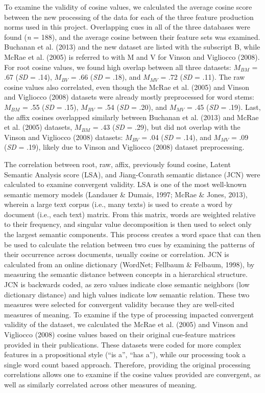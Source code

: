 \documentclass[english,,man]{apa6}
\begin{document}
To examine the validity of cosine values, we calculated the average cosine score between the new processing of the data for each of the three feature production norms used in this project. Overlapping cues in all of the three databases were found (\emph{n} = 188), and the average cosine between their feature sets was examined. Buchanan et al. (2013) and the new dataset are listed with the subscript B, while McRae et al. (2005) is referred to with M and V for Vinson and Vigliocco (2008). For root cosine values, we found high overlap between all three datasets: \(M_{BM}\) = .67 (\emph{SD} = .14), \(M_{BV}\) = .66 (\emph{SD} = .18), and \(M_{MV}\) = .72 (\emph{SD} = .11). The raw cosine values also correlated, even though the McRae et al. (2005) and Vinson and Vigliocco (2008) datasets were already mostly preprocessed for word stems: \(M_{BM}\) = .55 (\emph{SD} = .15), \(M_{BV}\) = .54 (\emph{SD} = .20), and \(M_{MV}\) = .45 (\emph{SD} = .19). Last, the affix cosines overlapped similarly between Buchanan et al. (2013) and McRae et al. (2005) datasets, \(M_{BM}\) = .43 (\emph{SD} = .29), but did not overlap with the Vinson and Vigliocco (2008) datasets: \(M_{BV}\) = .04 (\emph{SD} = .14), and \(M_{MV}\) = .09 (\emph{SD} = .19), likely due to Vinson and Vigliocco (2008) dataset preprocessing.

The correlation between root, raw, affix, previously found cosine, Latent Semantic Analysis score (LSA), and Jiang-Conrath semantic distance (JCN) were calculated to examine convergent validity. LSA is one of the most well-known semantic memory models (Landauer \& Dumais, 1997; McRae \& Jones, 2013), wherein a large text corpus (i.e., many texts) is used to create a word by document (i.e., each text) matrix. From this matrix, words are weighted relative to their frequency, and singular value decomposition is then used to select only the largest semantic components. This process creates a word space that can then be used to calculate the relation between two cues by examining the patterns of their occurrence across documents, usually cosine or correlation. JCN is calculated from an online dictionary (WordNet; Fellbaum \& Felbaum, 1998), by measuring the semantic distance between concepts in a hierarchical structure. JCN is backwards coded, as zero values indicate close semantic neighbors (low dictionary distance) and high values indicate low semantic relation. These two measures were selected for convergent validity because they are well-cited measures of meaning. To examine if the type of processing impacted convergent validity of the dataset, we calculated the McRae et al. (2005) and Vinson and Vigliocco (2008) cosine values based on their original cue-feature matrices provided in their publications. These datasets were coded for more complex features in a propositional style (\enquote{is a}, \enquote{has a}), while our processing took a single word count based approach. Therefore, providing the original processing correlations allows one to examine if the cosine values provided are convergent, as well as similarly correlated across other measures of meaning.
\end{document}
